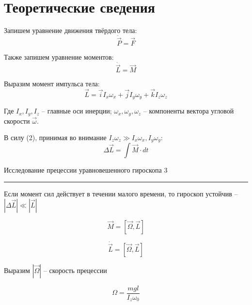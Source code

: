 \documentclass[12pt,a4paper]{scrartcl}
\begin{document}
	\section{Теоретические сведения}
	Запишем уравнение движения твёрдого тела:
	\begin{equation}
		\dot{\vec{P}} = \vec{F}
	\end{equation}
	
	Также запишем уравнение моментов:
	\begin{equation}
		\dot{\vec{L}} = \vec{M}
	\end{equation}

	Выразим момент импульса тела:
	\begin{equation}
		\vec{L} = \vec{i} I_x \omega_x +  \vec{j} I_y \omega_y +  \vec{k} I_z \omega_z
	\end{equation}

	Где $I_x, I_y, I_z $ -- главные оси инерции; $\omega_x, \omega_y, \omega_z$ -- компоненты вектора угловой скорости $ \vec{\omega} $.
	
	В силу (2), принимая во внимание $I_z \omega_z \gg I_x \omega_x, I_y \omega_y$:
	\begin{equation}
		\Delta \vec{L} = \int \vec{M} \cdot  dt
	\end{equation}

	
	\begin{flushleft}
		\footnotesize{Исследование прецессии уравновешенного гироскопа} \hspace{\fill} \footnotesize{3}
		\\[-0.3cm]\noindent\rule{\textwidth}{0.3pt}
	\end{flushleft}

	Если момент сил действует в течении малого времени, то гироскоп устойчив -- $|\Delta \vec{L}| \ll |\vec{L}|$ 
	
	\begin{equation}
		\vec{M} = [\vec{\Omega}, \vec{L}]
	\end{equation}
	
	\begin{equation}
		\dot{\vec{L}} = [\vec{\Omega}, \vec{L}] 
	\end{equation}
	
	Выразим $|\vec{\Omega}|$ -- скорость прецессии
	
	\begin{equation}
		\Omega = \frac{mgl}{I_z \omega_0}
	\end{equation}
	
\end{document}
